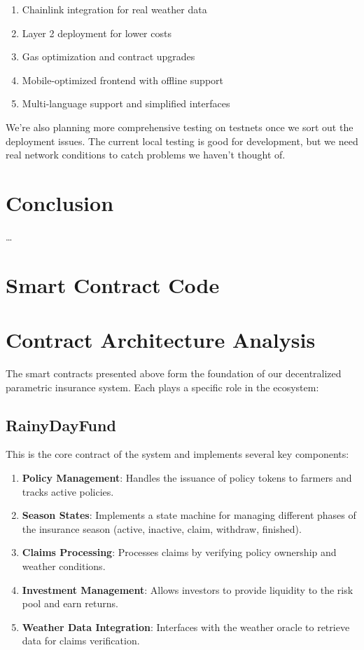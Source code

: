 \documentclass[11pt,a4paper]{article}
\begin{document}
	\begin{enumerate}
		\item Chainlink integration for real weather data
		\item Layer 2 deployment for lower costs
		\item Gas optimization and contract upgrades
		\item Mobile-optimized frontend with offline support
		\item Multi-language support and simplified interfaces
	\end{enumerate}

	We're also planning more comprehensive testing on testnets once we sort out the deployment issues.
	The current local testing is good for development, but we need real network conditions to catch problems we haven't thought of.


	\section{Conclusion}\label{sec:conclusion}
	\ldots

	\printbibliography

	\appendix
	\section{Smart Contract Code}\label{sec:contract-code}
	

	\section{Contract Architecture Analysis}\label{sec:contract-analysis}
	The smart contracts presented above form the foundation of our decentralized parametric insurance system.
    Each plays a specific role in the ecosystem:

	\subsection{RainyDayFund}\label{subsec:analysis-rainy-day-fund}
	This is the core contract of the system and implements several key components:

	\begin{enumerate}
	    \item \textbf{Policy Management}: Handles the issuance of policy tokens to farmers and tracks active policies.
	    \item \textbf{Season States}: Implements a state machine for managing different phases of the insurance season (active, inactive, claim, withdraw, finished).
	    \item \textbf{Claims Processing}: Processes claims by verifying policy ownership and weather conditions.
	    \item \textbf{Investment Management}: Allows investors to provide liquidity to the risk pool and earn returns.
	    \item \textbf{Weather Data Integration}: Interfaces with the weather oracle to retrieve data for claims verification.
	\end{enumerate}
\end{document}
